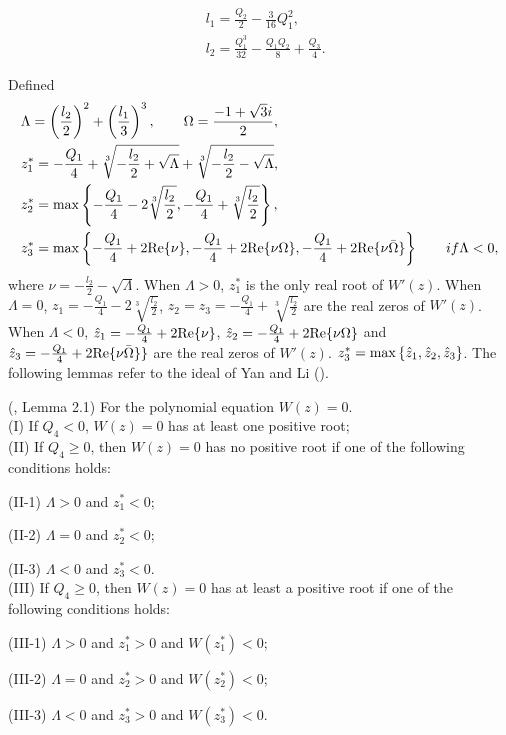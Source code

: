 \documentclass{CMHPhD-SIVD}
\begin{document}
\begin{align*}
&l_1=\frac{Q_2}{2}-\frac{3}{16}Q_1^2,\\
&l_2=\frac{Q_1^3}{32}-\frac{Q_1 Q_2}{8}+\frac{Q_3}{4}.
\end{align*}

Defined
\begin{align*}
&\Lambda=\left(\frac{l_2}{2} \right)^2+\left(\frac{l_1}{3} \right)^3,  \qquad \Omega=\frac{-1+\sqrt{3}i}{2}, \\
&z_1^*=-\frac{Q_1}{4}+\sqrt[3]{-\frac{l_2}{2}+\sqrt{\Lambda}}+\sqrt[3]{-\frac{l_2}{2}-\sqrt{\Lambda}},\\
&z_2^*={\rm max}\left\{-\frac{Q_1}{4}-2\sqrt[3]{\frac{l_2}{2}}, -\frac{Q_1}{4}+\sqrt[3]{\frac{l_2}{2}}\right\},\\
&z_3^*={\rm max}\left\{-\frac{Q_1}{4}+2{\rm Re}\{\nu\}, -\frac{Q_1}{4}+2{\rm Re}\{\nu \Omega\}, -\frac{Q_1}{4}+2{\rm Re}\{\nu \bar{\Omega}\}\right\} \qquad if \Lambda<0,\\
\end{align*}
where $\nu=-\frac{l_2}{2}-\sqrt{\Lambda}$. When $\Lambda>0$, $z_1^*$ is the only real root of $W'(z)$. When $\Lambda=0$, $z_1=-\frac{Q_1}{4}-2\sqrt[3]{\frac{l_2}{2}}$, $z_2=z_3=-\frac{Q_1}{4}+\sqrt[3]{\frac{l_2}{2}}$ are the real zeros of $W'(z)$. When $\Lambda<0$, $\hat{z}_1=-\frac{Q_1}{4}+2{\rm Re}\{\nu\}$, $\hat{z}_2=-\frac{Q_1}{4}+2{\rm Re}\{\nu\Omega\}$ and $\hat{z}_3=-\frac{Q_1}{4}+2{\rm Re}\{\nu \bar{\Omega}\}\}$ are the real zeros of $W'(z)$. $z_3^*={\rm max}\left\{\hat{z}_1, \hat{z}_2, \hat{z}_3\right\}$. The following lemmas refer to the ideal of Yan and Li (\cite{yan2006stability}).

\begin{lemma}\label{3.1} (\cite{yan2006stability}, Lemma 2.1)
For the polynomial equation $W(z)=0$.\\
(I) If $Q_4<0$,  $W(z)=0$ has at least one positive root;\\
(II) If $Q_4\geq0$, then $W(z)=0$ has no positive root if one of the following conditions holds:

(II-1) $\Lambda>0$ and $z_1^*<0$;

(II-2) $\Lambda=0$ and $z_2^*<0$;

(II-3) $\Lambda<0$ and $z_3^*<0$.\\
(III) If $Q_4\geq0$, then $W(z)=0$ has at least a positive root if one of the following conditions holds:

(III-1) $\Lambda>0$ and $z_1^*>0$ and $W(z_1^*)<0$;

(III-2) $\Lambda=0$ and $z_2^*>0$ and $W(z_2^*)<0$;

(III-3) $\Lambda<0$ and $z_3^*>0$ and $W(z_3^*)<0$.
\end{lemma}
\end{document}
